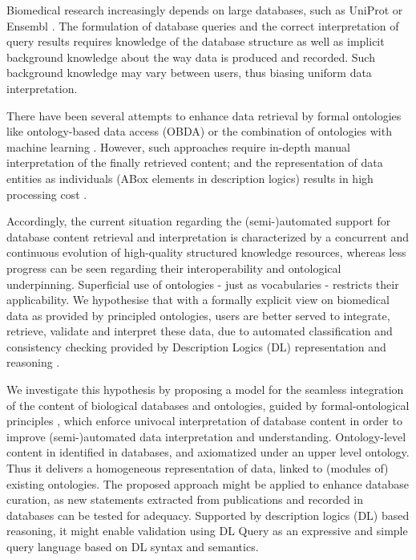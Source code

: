 Biomedical research increasingly depends on large databases, such as UniProt  \citep{UniProtConsortium2014} or Ensembl \citep{Cunningham2014}. The formulation of database queries and the correct interpretation of query results requires knowledge of the database structure as well as implicit background knowledge about the way data is produced and recorded. 
Such background knowledge may vary between users, thus biasing uniform data interpretation. 

There have been several attempts to enhance data retrieval by formal ontologies like ontology-based data access (OBDA) \citep{Poggi2008} or the combination of ontologies with machine learning \citep{Lehmann2009}. However, such approaches require in-depth manual interpretation of the finally retrieved content; and the representation of data entities  as individuals (ABox elements in description logics) results in high processing cost \citep{Hustadt2005}.

Accordingly, the current situation regarding the (semi-)automated support for database content retrieval and interpretation is characterized by a concurrent and continuous evolution of high-quality structured knowledge resources, whereas less progress can be seen regarding their interoperability and ontological underpinning. Superficial use of ontologies - just as vocabularies - restricts their applicability. We hypothesise that with a formally explicit view on biomedical data as provided by principled ontologies, users are better served to integrate, retrieve, validate and interpret these data, due to automated classification and consistency checking provided by Description Logics (DL) representation and reasoning \citep{Baader2007g}. 

We investigate this hypothesis by proposing a model for the seamless integration of the content of biological databases and ontologies, guided by formal-ontological principles \citep{Smith2007}, which enforce univocal interpretation of database content in order to improve (semi-)automated data interpretation and understanding. Ontology-level content in identified in databases, and axiomatized under an upper level ontology. Thus it delivers a homogeneous representation of data, linked to (modules of) existing ontologies.
The proposed approach might be applied to enhance database curation, as new statements extracted from publications and recorded in databases can be tested for adequacy. Supported by description logics (DL) based reasoning, it might enable validation using DL Query as an expressive and simple query language based on DL syntax and semantics. 

